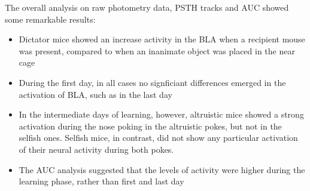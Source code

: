 \documentclass[a4paper]{article}
\begin{document}
The overall analysis on raw photometry data, PSTH tracks and AUC showed some remarkable results:

\begin{itemize}
	
	\item Dictator mice showed an increase activity in the BLA when a recipient mouse was present, compared to when an inanimate object was placed in the near cage
	
	\item During the first day, in all cases no signficiant differences emerged in the activation of BLA, such as in the last day
	
	\item In the intermediate days of learning, however, altruistic mice showed a strong activation during the nose poking in the altruistic pokes, but not in the selfish ones. Selfish mice, in contrast, did not show any particular activation of their neural activity during both pokes. 
	
	\item The AUC analysis suggested that the levels of activity were higher during the learning phase, rather than first and last day
\end{itemize}
\end{document}
